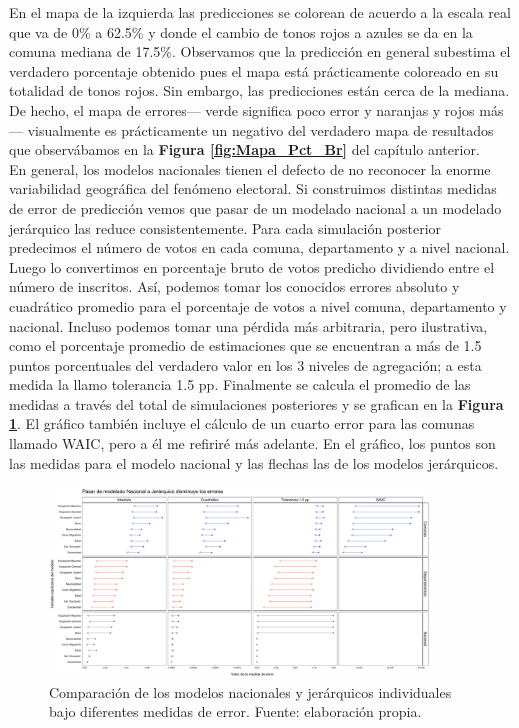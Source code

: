 En el mapa de la izquierda las predicciones se colorean de acuerdo a la escala real que va de 0\% a 62.5\% y donde el cambio de tonos rojos a azules se da en la comuna mediana de 17.5\%. Observamos que la predicción en general subestima el verdadero porcentaje obtenido pues el mapa está prácticamente coloreado en su totalidad de tonos rojos. Sin embargo, las predicciones están cerca de la mediana. De hecho, el mapa de errores--- verde significa poco error y naranjas y rojos más--- visualmente es prácticamente un negativo del verdadero mapa de resultados que observábamos en la \textbf{Figura \ref{fig:Mapa_Pct_Br}} del capítulo anterior.\\

En general, los modelos nacionales tienen el defecto de no reconocer la enorme variabilidad geográfica del fenómeno electoral. Si construimos distintas medidas de error de predicción vemos que pasar de un modelado nacional a un modelado jerárquico las reduce consistentemente. Para cada simulación posterior predecimos el número de votos en cada comuna, departamento y a nivel nacional. Luego lo convertimos en porcentaje bruto de votos predicho dividiendo entre el número de inscritos. Así, podemos tomar los conocidos errores absoluto y cuadrático promedio para el porcentaje de votos a nivel comuna, departamento y nacional. Incluso podemos tomar una pérdida más arbitraria, pero ilustrativa, como el porcentaje promedio de estimaciones que se encuentran a más de 1.5 puntos porcentuales del verdadero valor en los 3 niveles de agregación; a esta medida la llamo tolerancia 1.5 pp. Finalmente se calcula el promedio de las medidas a través del total de simulaciones posteriores y se grafican en la \textbf{Figura \ref{fig:Errores_Modelos_Individuales}}. El gráfico también incluye el cálculo de un cuarto error para las comunas llamado WAIC, pero a él me refiriré más adelante. En el gráfico, los puntos son las medidas para el modelo nacional y las flechas las de los modelos jerárquicos.\\ 

\begin{figure}
	\centering
	\includegraphics[width = 0.9\textwidth]{Figs/Modelado/Graf_Errores_Modelos_Individuales}
	\caption{Comparación de los modelos nacionales y jerárquicos individuales bajo diferentes medidas de error. Fuente: elaboración propia.}
	\label{fig:Errores_Modelos_Individuales}
\end{figure} 


